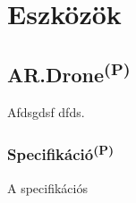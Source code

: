 \chapter{Eszközök}

\section{AR.Drone\textsuperscript{(P)}}

	\hspace{15pt}Afdsgdsf dfds. \cite{konyv}	

	\newpage

	\subsection{Specifikáció\textsuperscript{(P)}}
	
		\hspace{15pt}A specifikációs  \cite{url}